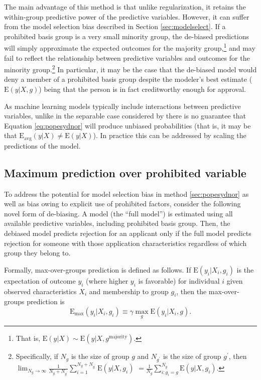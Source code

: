 The main advantage of this method is that unlike regularization, it retains the within-group predictive power of the predictive variables. However, it can suffer from the model selection bias described in Section \ref{sec:modelselect}. If a prohibited basis group is a very small minority group, the de-biased predictions will simply approximate the expected outcomes for the majority group,\footnote{That is, $\text{E}\left(y\vert X\right)\sim\text{E}\left(y\vert X,g^{\text{majority}}\right)$.} and may fail to reflect the relationship between predictive variables and outcomes for the minority group.\footnote{Specifically, if $N_{g}$ is the size of group $g$ and $N_{g^\prime}$ is the size of group $g^\prime$, then $\lim_{N_{g}\rightarrow \infty}\frac{1}{N_g+N_{g^\prime}} \sum_{i = 1}^{N_g+N_{g^\prime}} \text{E}\left(y\vert X,g_i\right)$  $=\frac{1}{N_g} \sum_{i:g_i=g}^{N_g} \text{E}\left(y\vert X,g_i\right)$.} In particular, it may be the case that the de-biased model would deny a member of a prohibited basis group despite the modeler's best estimate ($\text{E}\left(y\vert X,g\right)$) being that the person is in fact creditworthy enough for approval. 

As machine learning models typically include interactions between predictive variables, unlike in the separable case considered by  there is no guarantee that Equation \ref{eq:popesydnor} will produce unbiased probabilities (that is, it may be that $\text{E}_{\text{avg}}\left(y\vert X\right)\neq\text{E}\left(y\vert X\right)$). In practice this can be addressed by scaling the predictions of the model.

\subsection{Maximum prediction over prohibited variable}\label{sec:lop}
To address the potential for model selection bias in method \ref{sec:popesydnor} as well as bias owing to explicit use of prohibited factors, consider the following novel form of de-biasing. A model (the ``full model'') is estimated using all available predictive variables, including prohibited basis group. Then, the debiased model predicts rejection for an applicant only if the full model predicts rejection for someone with those application characteristics regardless of which group they belong to.

Formally, max-over-groups prediction is defined as follows. If $\text{E}\left(y_i\vert X_i,g_i\right)$ is the expectation of outcome $y_i$ (where higher $y_i$ is favorable) for individual $i$ given observed characteristics $X_i$ and membership to group $g_i$, then the max-over-groups prediction is
\begin{equation}\label{eq:defn}
	\text{E}_{\text{max}} \left(y_i\vert X_i,g_i\right) \equiv \gamma \max_{g} \text{E}\left(y_i\vert X_i,g\right). 
\end{equation}

